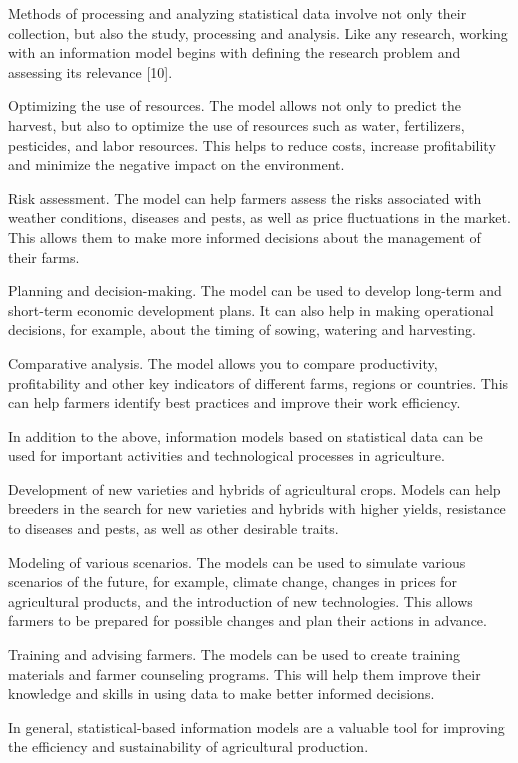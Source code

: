Methods of processing and analyzing statistical data involve not only
their collection, but also the study, processing and analysis. Like any
research, working with an information model begins with defining the
research problem and assessing its relevance {[}10{]}.

Optimizing the use of resources. The model allows not only to predict
the harvest, but also to optimize the use of resources such as water,
fertilizers, pesticides, and labor resources. This helps to reduce
costs, increase profitability and minimize the negative impact on the
environment.

Risk assessment. The model can help farmers assess the risks associated
with weather conditions, diseases and pests, as well as price
fluctuations in the market. This allows them to make more informed
decisions about the management of their farms.

Planning and decision-making. The model can be used to develop long-term
and short-term economic development plans. It can also help in making
operational decisions, for example, about the timing of sowing, watering
and harvesting.

Comparative analysis. The model allows you to compare productivity,
profitability and other key indicators of different farms, regions or
countries. This can help farmers identify best practices and improve
their work efficiency.

In addition to the above, information models based on statistical data
can be used for important activities and technological processes in
agriculture.

Development of new varieties and hybrids of agricultural crops. Models
can help breeders in the search for new varieties and hybrids with
higher yields, resistance to diseases and pests, as well as other
desirable traits.

Modeling of various scenarios. The models can be used to simulate
various scenarios of the future, for example, climate change, changes in
prices for agricultural products, and the introduction of new
technologies. This allows farmers to be prepared for possible changes
and plan their actions in advance.

Training and advising farmers. The models can be used to create training
materials and farmer counseling programs. This will help them improve
their knowledge and skills in using data to make better informed
decisions.

In general, statistical-based information models are a valuable tool for
improving the efficiency and sustainability of agricultural production.

